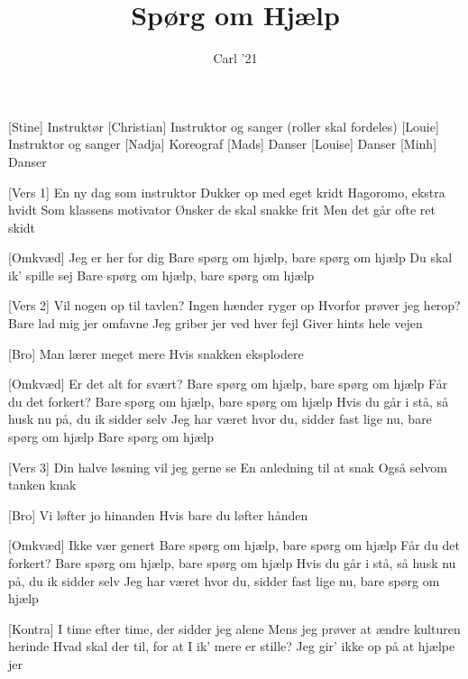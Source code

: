 \documentclass[a4paper,11pt]{article}
\title{Spørg om Hjælp}
\author{Carl '21}
\begin{document}
\maketitle

\begin{roles}
[Stine] Instruktør
[Christian] Instruktor og sanger (roller skal fordeles)
[Louie] Instruktor og sanger 
[Nadja] Koreograf
[Mads] Danser
[Louise] Danser
[Minh] Danser
\end{roles}


\begin{song}
[Vers 1] En ny dag som instruktor
    Dukker op med eget kridt
    Hagoromo, ekstra hvidt
    Som klassens motivator
    Ønsker de skal snakke frit
    Men det går ofte ret skidt

[Omkvæd] Jeg er her for dig
    Bare spørg om hjælp, bare spørg om hjælp
    Du skal ik' spille sej
    Bare spørg om hjælp, bare spørg om hjælp

[Vers 2] Vil nogen op til tavlen?
    Ingen hænder ryger op
    Hvorfor prøver jeg herop?
    Bare lad mig jer omfavne
    Jeg griber jer ved hver fejl
    Giver hints hele vejen

[Bro] Man lærer meget mere
    Hvis snakken eksplodere

[Omkvæd] Er det alt for svært?
    Bare spørg om hjælp, bare spørg om hjælp
    Får du det forkert?
    Bare spørg om hjælp, bare spørg om hjælp
    Hvis du går i stå, så husk nu på, du ik sidder selv
    Jeg har været hvor du, sidder fast lige nu, bare spørg om hjælp
    Bare spørg om hjælp

[Vers 3] Din halve løsning vil jeg gerne se
    En anledning til at snak
    Også selvom tanken knak

[Bro] Vi løfter jo hinanden
    Hvis bare du løfter hånden

[Omkvæd] Ikke vær genert
    Bare spørg om hjælp, bare spørg om hjælp
    Får du det forkert?
    Bare spørg om hjælp, bare spørg om hjælp
    Hvis du går i stå, så husk nu på, du ik sidder selv
    Jeg har været hvor du, sidder fast lige nu, bare spørg om hjælp

[Kontra] I time efter time, der sidder jeg alene
    Mens jeg prøver at ændre kulturen herinde
    Hvad skal der til, for at I ik' mere er stille?
    Jeg gir' ikke op på at hjælpe jer
    


\end{song}
\end{document}

